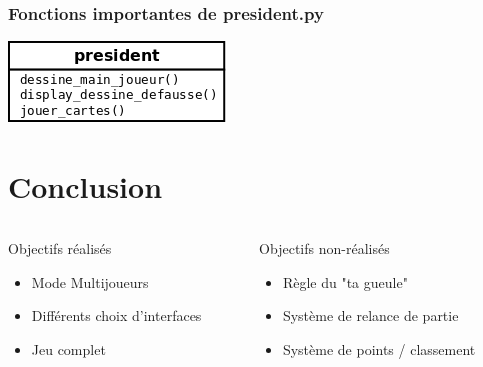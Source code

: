 \documentclass{beamer}
\begin{document}
\begin{frame}
\frametitle{Fonctions importantes de president.py}

\begin{center}
\includegraphics[scale=0.8]{./img/president.png}
\end{center}

\end{frame}

\section{Conclusion}
\begin{frame}
\begin{columns}
\begin{column}{5cm}
Objectifs réalisés
\newline
\begin{itemize}
    \item[\ding{47}] Mode Multijoueurs
 	\item[\ding{47}] Différents choix d'interfaces
 	\item[\ding{47}] Jeu complet
\end{itemize}
\end{column}
\begin{column}{4cm}
Objectifs non-réalisés
\newline
\begin{itemize}
    \item[\ding{47}] Règle du "ta gueule"
 	\item[\ding{47}] Système de relance de partie
 	\item[\ding{47}] Système de points / classement
\end{itemize}
\end{column}
\end{columns}
\end{frame}
\end{document}
